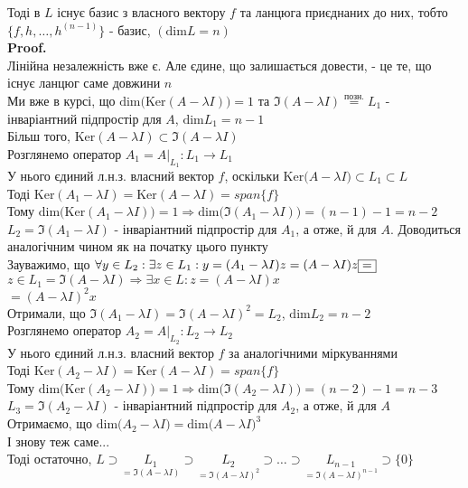 \documentclass[a4paper, 14pt]{extarticle}
\def\proof{\textbf{Proof.}\\}
\def\bigline{\vspace{5mm}\\}
\def\dim#1{\textrm{dim} {#1}}
\def\ker#1{\textrm{Ker} {#1}}
\begin{document}
Тоді в $L$ існує базис з власного вектору $f$ та ланцюга приєднаних до них, тобто\\
$\{f,h,\dots,h^{(n-1)}\}$ - базис, $(\dim L = n)$\\
\proof
Лінійна незалежність вже є. Але єдине, що залишається довести, - це те, що існує ланцюг саме довжини $n$\\
Ми вже в курсі, що $\dim(\textrm{Ker}(A-\lambda I)) = 1$ та $\Im(A-\lambda I) \overset{\textrm{позн.}}{=} L_1$ - інваріантний підпростір для $A$, $\dim L_1 = n-1$\\
Більш того, $\textrm{Ker}(A-\lambda I) \subset \Im(A-\lambda I)$
\bigline
Розглянемо оператор $A_1 = A |_{L_1}: L_1 \to L_1$\\
У нього єдиний л.н.з. власний вектор $f$, оскільки $\ker(A-\lambda I) \subset L_1 \subset L$\\
Тоді $\textrm{Ker}(A_1-\lambda I) = \textrm{Ker}(A-\lambda I) = span\{f\}$\\
Тому $\dim(\textrm{Ker}(A_1 - \lambda I)) = 1 \Rightarrow \dim (\Im(A_1-\lambda I)) = (n-1)-1=n-2$\\
$L_2 = \Im(A_1-\lambda I)$ - інваріантний підпростір для $A_1$, а отже, й для $A$. Доводиться аналогічним чином як на початку цього пункту\\
Зауважимо, що $\forall y \in L_2: \exists z \in L_1: \\ y = (A_1 - \lambda I)z = (A-\lambda I)z \boxed{=}$\\
$z \in L_1 = \Im(A-\lambda I) \Rightarrow \exists x \in L: z = (A-\lambda I)x$\\
$\boxed{=} (A-\lambda I)^2 x$\\
Отримали, що $\Im(A_1 - \lambda I) = \Im(A-\lambda I)^2 = L_2$, $\dim L_2 = n-2$
\bigline
Розглянемо оператор $A_2 = A |_{L_2}: L_2 \to L_2$\\
У нього єдиний л.н.з. власний вектор $f$ за аналогічними міркуваннями\\
Тоді $\textrm{Ker}(A_2-\lambda I) = \textrm{Ker}(A-\lambda I) = span\{f\}$\\
Тому $\dim(\textrm{Ker}(A_2 - \lambda I)) = 1 \Rightarrow \dim (\Im(A_2-\lambda I)) = (n-2)-1=n-3$\\
$L_3 = \Im(A_2-\lambda I)$ - інваріантний підпростір для $A_2$, а отже, й для $A$\\
Отримаємо, що $\dim (A_2 - \lambda I) = \dim (A-\lambda I)^3$\\
І знову теж саме...
\bigline
Тоді остаточно, $L \supset \underset{=\Im(A-\lambda I)}{L_1} \supset \underset{=\Im(A-\lambda I)^2}{L_2} \supset \dots \supset \underset{=\Im(A-\lambda I)^{n-1}}{L_{n-1}} \supset \{0\}$\\
\end{document}
